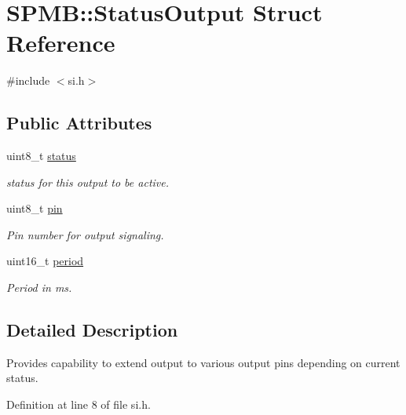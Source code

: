 \hypertarget{structSPMB_1_1StatusOutput}{}\section{S\+P\+MB\+:\+:Status\+Output Struct Reference}
\label{structSPMB_1_1StatusOutput}


{\ttfamily \#include $<$si.\+h$>$}

\subsection*{Public Attributes}
\begin{DoxyCompactItemize}
\item 
uint8\+\_\+t \hyperlink{structSPMB_1_1StatusOutput_add1d5add57e6cd975e5b39522e05fea6}{status}\hypertarget{structSPMB_1_1StatusOutput_add1d5add57e6cd975e5b39522e05fea6}{}\label{structSPMB_1_1StatusOutput_add1d5add57e6cd975e5b39522e05fea6}

\begin{DoxyCompactList}\small\item\em status for this output to be active. \end{DoxyCompactList}\item 
uint8\+\_\+t \hyperlink{structSPMB_1_1StatusOutput_ad24bb8ff0eadf44cc015c13cab51fdb3}{pin}\hypertarget{structSPMB_1_1StatusOutput_ad24bb8ff0eadf44cc015c13cab51fdb3}{}\label{structSPMB_1_1StatusOutput_ad24bb8ff0eadf44cc015c13cab51fdb3}

\begin{DoxyCompactList}\small\item\em Pin number for output signaling. \end{DoxyCompactList}\item 
uint16\+\_\+t \hyperlink{structSPMB_1_1StatusOutput_a9122c072acdfd8bfd25caa02bba61cfa}{period}\hypertarget{structSPMB_1_1StatusOutput_a9122c072acdfd8bfd25caa02bba61cfa}{}\label{structSPMB_1_1StatusOutput_a9122c072acdfd8bfd25caa02bba61cfa}

\begin{DoxyCompactList}\small\item\em Period in ms. \end{DoxyCompactList}\end{DoxyCompactItemize}


\subsection{Detailed Description}
Provides capability to extend output to various output pins depending on current status. 

Definition at line 8 of file si.\+h.

